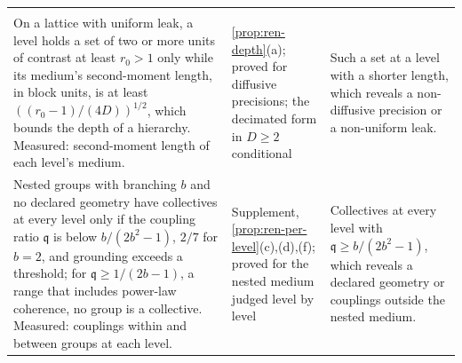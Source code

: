 \begin{longtable}{@{}>{\raggedright\arraybackslash}p{6.5cm}>{\raggedright\arraybackslash}p{3.9cm}>{\raggedright\arraybackslash}p{5.1cm}@{}}
\midrule
\multicolumn{3}{@{}l}{\textit{Renormalization, \cref{hyp:int-h5}(d)}}\\
On a lattice with uniform leak, a level holds a set of two or more units of contrast at least $r_0>1$ only while its medium's second-moment length, in block units, is at least $((r_0-1)/(4D))^{1/2}$, which bounds the depth of a hierarchy. Measured: second-moment length of each level's medium. & \cref{prop:ren-depth}(a); proved for diffusive precisions; the decimated form in $D\ge2$ conditional & Such a set at a level with a shorter length, which reveals a non-diffusive precision or a non-uniform leak.\\
\addlinespace
Nested groups with branching $b$ and no declared geometry have collectives at every level only if the coupling ratio $\mathfrak q$ is below $b/(2b^2-1)$, $2/7$ for $b=2$, and grounding exceeds a threshold; for $\mathfrak q\ge1/(2b-1)$, a range that includes power-law coherence, no group is a collective. Measured: couplings within and between groups at each level. & Supplement, \cref{prop:ren-per-level}(c),(d),(f); proved for the nested medium judged level by level & Collectives at every level with $\mathfrak q\ge b/(2b^2-1)$, which reveals a declared geometry or couplings outside the nested medium.\\
\end{longtable}
\endgroup

